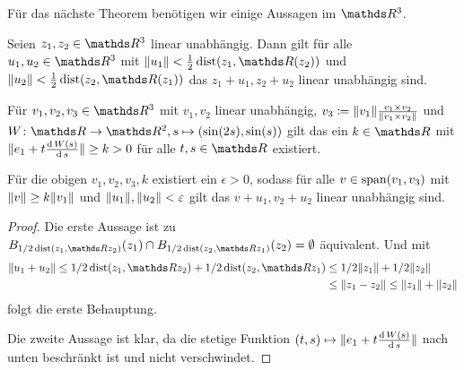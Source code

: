 Für das nächste Theorem benötigen wir einige Aussagen im $ \R^3 $.
\begin{Lem}\label{lem:hilfSmaleHirsch}
	Seien $ z_1,z_2\in\R^3 $ linear unabhängig. Dann gilt für alle
	$ u_1,u_2\in\R^3 $ mit $ \norm{u_1} < \frac{1}{2}\dist(z_1,\R(z_2)) $
	und $ \norm{u_2}<\frac{1}{2}\dist(z_2,\R(z_1)) $ das $ z_1+u_1,z_2+u_2 $
	linear unabhängig sind.
	
	Für $ v_1,v_2,v_3\in\R^3 $ mit $ v_1,v_2 $ linear unabhängig,
	$ v_3 \coloneqq \lVert v_1\rVert \frac{v_1\times v_2}{\lVert v_1\times v_2\rVert}$ 
	und $ \abb{W}{\R}{\R^2}, s\mapsto (\sin(2s),\sin(s)) $ gilt das ein $ k\in\R $
	mit $ \lVert e_1 + t \frac{\operatorname{d} W(s)}{\operatorname{d} s}\rVert \geq k > 0 $ für alle $ t,s\in\R $
	existiert.
	
	Für die obigen $ v_1,v_2,v_3,k $ existiert ein $ \epsilon >0 $, sodass
	für alle $ v\in\operatorname{span}(v_1,v_3) $ mit $ \lVert v\rVert \geq k\lVert v_1\rVert $ und $ \lVert u_1\rVert,\lVert u_2\rVert <\varepsilon $ gilt das $ v+u_1, v_2+u_2 $ linear
	unabhängig sind.
	\begin{proof}
		Die erste Aussage ist zu $ B_{1/2 \dist(z_1,\R z_2)}(z_1) \cap  B_{1/2\dist(z_2,\R z_1)}(z_2) = \emptyset $ äquivalent. Und mit
		\begin{align*}
			\norm{u_1+u_2} \leq 1/2 \dist(z_1,\R z_2) + 1/2 \dist(z_2,\R z_1)
			&\leq 1/2 \norm{z_1} + 1/2 \norm{z_2} \\
			&\leq \norm{z_1 - z_2} \leq \norm{z_1} + \norm{z_2}
		\end{align*}
		folgt die erste Behauptung.
		
		Die zweite Aussage ist klar, da die stetige Funktion $ (t,s) \mapsto \lVert e_1 + t \frac{\operatorname{d} W(s)}{\operatorname{d} s}\rVert $ nach unten beschränkt ist und
		nicht verschwindet.
	\end{proof}
\end{Lem}

